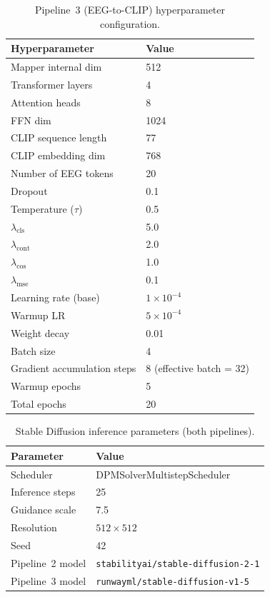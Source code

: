 \documentclass{article}
\begin{document}
\begin{table}[h]
  \centering
  \caption{Pipeline~3 (EEG-to-CLIP) hyperparameter configuration.}
  \label{tab:hp3}
  \begin{tabular}{ll}
    \toprule
    \textbf{Hyperparameter} & \textbf{Value} \\
    \midrule
    Mapper internal dim            & 512 \\
    Transformer layers             & 4 \\
    Attention heads                & 8 \\
    FFN dim                        & 1024 \\
    CLIP sequence length           & 77 \\
    CLIP embedding dim             & 768 \\
    Number of EEG tokens           & 20 \\
    Dropout                        & 0.1 \\
    Temperature ($\tau$)           & 0.5 \\
    $\lambda_\mathrm{cls}$         & 5.0 \\
    $\lambda_\mathrm{cont}$        & 2.0 \\
    $\lambda_\mathrm{cos}$         & 1.0 \\
    $\lambda_\mathrm{mse}$         & 0.1 \\
    Learning rate (base)           & $1 \times 10^{-4}$ \\
    Warmup LR                      & $5 \times 10^{-4}$ \\
    Weight decay                   & 0.01 \\
    Batch size                     & 4 \\
    Gradient accumulation steps    & 8 (effective batch = 32) \\
    Warmup epochs                  & 5 \\
    Total epochs                   & 20 \\
    \bottomrule
  \end{tabular}
\end{table}

\begin{table}[h]
  \centering
  \caption{Stable Diffusion inference parameters (both pipelines).}
  \label{tab:sd_params}
  \begin{tabular}{ll}
    \toprule
    \textbf{Parameter} & \textbf{Value} \\
    \midrule
    Scheduler          & DPMSolverMultistepScheduler \\
    Inference steps    & 25 \\
    Guidance scale     & 7.5 \\
    Resolution         & $512 \times 512$ \\
    Seed               & 42 \\
    Pipeline~2 model   & \texttt{stabilityai/stable-diffusion-2-1} \\
    Pipeline~3 model   & \texttt{runwayml/stable-diffusion-v1-5} \\
    \bottomrule
  \end{tabular}
\end{table}
\end{document}
